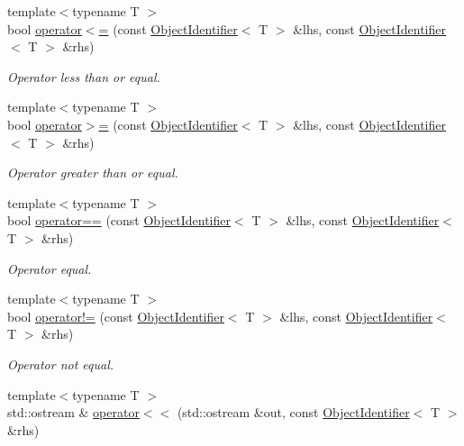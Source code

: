 \begin{DoxyCompactItemize}
{\footnotesize template$<$typename T $>$ }\\bool \hyperlink{namespaceshad_a3c37dd61ed6b63c4eb35b3bc7c35d6c0}{operator$<$=} (const \hyperlink{classshad_1_1ObjectIdentifier}{Object\-Identifier}$<$ T $>$ \&lhs, const \hyperlink{classshad_1_1ObjectIdentifier}{Object\-Identifier}$<$ T $>$ \&rhs)
\begin{DoxyCompactList}\small\item\em Operator less than or equal. \end{DoxyCompactList}\item 
{\footnotesize template$<$typename T $>$ }\\bool \hyperlink{namespaceshad_a59733f17e9061a22cd234fcfa3e022ff}{operator$>$=} (const \hyperlink{classshad_1_1ObjectIdentifier}{Object\-Identifier}$<$ T $>$ \&lhs, const \hyperlink{classshad_1_1ObjectIdentifier}{Object\-Identifier}$<$ T $>$ \&rhs)
\begin{DoxyCompactList}\small\item\em Operator greater than or equal. \end{DoxyCompactList}\item 
{\footnotesize template$<$typename T $>$ }\\bool \hyperlink{namespaceshad_a82a20cc9e8de1bf3341c2506f7c1abc9}{operator==} (const \hyperlink{classshad_1_1ObjectIdentifier}{Object\-Identifier}$<$ T $>$ \&lhs, const \hyperlink{classshad_1_1ObjectIdentifier}{Object\-Identifier}$<$ T $>$ \&rhs)
\begin{DoxyCompactList}\small\item\em Operator equal. \end{DoxyCompactList}\item 
{\footnotesize template$<$typename T $>$ }\\bool \hyperlink{namespaceshad_a73513752568c47bd71b06a4fc328eec4}{operator!=} (const \hyperlink{classshad_1_1ObjectIdentifier}{Object\-Identifier}$<$ T $>$ \&lhs, const \hyperlink{classshad_1_1ObjectIdentifier}{Object\-Identifier}$<$ T $>$ \&rhs)
\begin{DoxyCompactList}\small\item\em Operator not equal. \end{DoxyCompactList}\item 
{\footnotesize template$<$typename T $>$ }\\std\-::ostream \& \hyperlink{namespaceshad_a5761ac18b234d1551ab55f1ce32214cb}{operator$<$$<$} (std\-::ostream \&out, const \hyperlink{classshad_1_1ObjectIdentifier}{Object\-Identifier}$<$ T $>$ \&rhs)

\end{DoxyCompactItemize}
